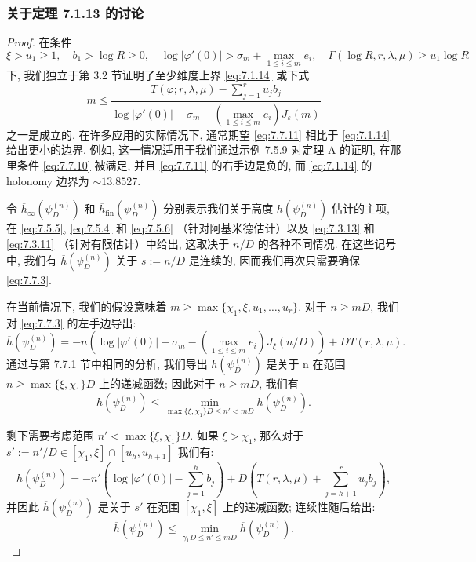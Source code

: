 \subsubsection{关于定理 7.1.13 的讨论}\label{sec:7.7.9}

\begin{proof}
在条件
\begin{equation}\label{eq:7.7.10}
\xi > u_1 \ge 1, \quad b_1 > \log R \ge 0, \quad \log |\varphi'(0)| > \sigma_m + \max_{1 \le i \le m} e_i, \quad \Gamma(\log R, r, \lambda, \mu) \ge u_1 \log R
\end{equation}
下, 我们独立于第 3.2 节证明了至少维度上界 \eqref{eq:7.1.14} 或下式
\begin{equation}\label{eq:7.7.11}
m \le \frac{T(\varphi; r, \lambda, \mu) - \sum_{j=1}^{r} u_j b_j}{\log |\varphi'(0)| - \sigma_m - (\max_{1 \le i \le m} e_i) J_{\varepsilon}(m)}
\end{equation}
之一是成立的. 在许多应用的实际情况下, 通常期望 \eqref{eq:7.7.11} 相比于 \eqref{eq:7.1.14} 给出更小的边界. 
例如, 这一情况适用于我们通过示例 7.5.9 对定理 A 的证明, 
在那里条件 \eqref{eq:7.7.10} 被满足, 并且 \eqref{eq:7.7.11} 的右手边是负的, 
而 \eqref{eq:7.1.14} 的 holonomy 边界为 \(\sim 13.8527\).

令 \(\overline{h}_{\infty}(\psi_D^{(n)})\) 和 \(\overline{h}_{\text{fin}}(\psi_D^{(n)})\) 
分别表示我们关于高度 \(h(\psi_D^{(n)})\) 估计的主项, 
在 \eqref{eq:7.5.5}, \eqref{eq:7.5.4} 和 \eqref{eq:7.5.6} （针对阿基米德估计）以及 \eqref{eq:7.3.13} 和 \eqref{eq:7.3.11} （针对有限估计）中给出, 
这取决于 \(n/D\) 的各种不同情况. 在这些记号中, 我们有 \(\overline{h}(\psi_D^{(n)})\) 关于 \(s := n/D\) 是连续的, 
因而我们再次只需要确保 \eqref{eq:7.7.3}.

在当前情况下, 我们的假设意味着 \(m \ge \max\{\chi_1, \xi, u_1, \dots, u_r\}\). 
对于 \(n \ge mD\), 我们对 \eqref{eq:7.7.3} 的左手边导出:
\[ \overline{h}(\psi_D^{(n)}) = -n \left( \log |\varphi'(0)| - \sigma_m - \left( \max_{1 \le i \le m} e_i \right) J_{\xi}(n/D) \right) + DT(r, \lambda, \mu). \]
通过与第 7.7.1 节中相同的分析, 我们导出 \(\overline{h}(\psi_D^{(n)})\) 是关于 n 
在范围 \(n \ge \max\{\xi, \chi_1\}D\) 上的递减函数; 
因此对于 \(n \ge mD\), 我们有
\[ \overline{h}(\psi_D^{(n)}) \leq \min_{\max\{\xi,\chi_1\}D \leq n' < mD} \overline{h}(\psi_D^{(n)}). \]

剩下需要考虑范围 \(n' < \max\{\xi, \chi_1\}D\). 
如果 \(\xi > \chi_1\), 那么对于 \(s' := n'/D \in [\chi_1, \xi] \cap [u_h, u_{h+1}]\) 我们有:
\[ \overline{h}(\psi_D^{(n)}) = -n' \left( \log |\varphi'(0)| - \sum_{j=1}^h b_j \right) + D \left( T(r, \lambda, \mu) + \sum_{j=h+1}^r u_j b_j \right), \]
并因此 \(\overline{h}(\psi_D^{(n)})\) 是关于 \(s'\) 在范围 \([\chi_1, \xi]\) 上的递减函数; 
连续性随后给出:
\[ \overline{h}(\psi_D^{(n)}) \le \min_{\gamma_1 D \le n' \le mD} \overline{h}(\psi_D^{(n)}). \]


\end{proof}
